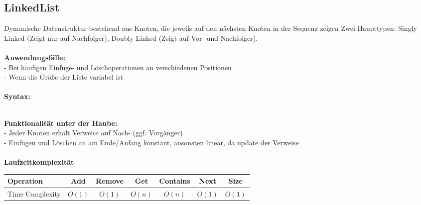 \documentclass[../main.tex]{subfiles}
\begin{document}
		\subsection{LinkedList}
		Dynamische Datenstruktur bestehend aus Knoten, die jeweils auf den nächsten Knoten in der Sequenz zeigen
		Zwei Haupttypen: Singly Linked (Zeigt nur auf Nachfolger), Doubly Linked (Zeigt  auf Vor- und Nachfolger).\\\\
		\textbf{Anwendungsfälle:}\\
		- Bei häufigen Einfüge- und Löschoperationen an verschiedenen Positionen\\
		- Wenn die Größe der Liste variabel ist\\\\
		\textbf{Syntax:}
		 
		\\
		\textbf{Funktionalität unter der Haube:}\\
		- Jeder Knoten erhält Verweise auf Nach- (ggf. Vorgänger)\\
		- Einfügen und Löschen an am Ende/Anfang konstant, ansonsten linear, da update der Verweise\\\\
		\textbf{Laufzeitkomplexität}\\
		\begin{table}[ht]
			\centering
			\begin{tabular}{l *{6}{c}}
				\toprule
				Operation & Add & Remove & Get & Contains & Next & Size \\
				\midrule
				Time Complexity & $O(1)$ & $O(1)$ & $O(n)$ & $O(n)$ & $O(1)$ & $O(1)$ \\
				\bottomrule
			\end{tabular}
		\end{table}
	\clearpage
		
		
		\clearpage
\end{document}
